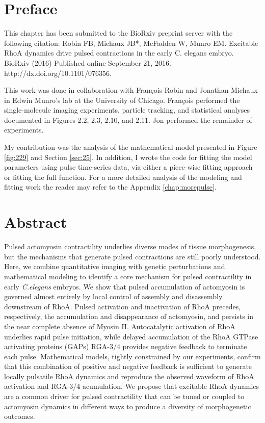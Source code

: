 
\section{Preface}
This chapter has been submitted to the BioRxiv preprint server with the following citation: Robin FB, Michaux JB*, McFadden W, Munro EM.  Excitable RhoA dynamics drive pulsed contractions in the early C. elegans embryo.  BioRxiv (2016) Published online September 21, 2016. http://dx.doi.org/10.1101/076356.


This work was done in collaboration with Fran\c{c}ois Robin and Jonathan Michaux in Edwin Munro's lab at the University of Chicago.  Fran\c{c}ois performed the single-molecule imaging experiments, particle tracking, and statistical analyses documented in Figures 2.2, 2.3, 2.10, and 2.11.  Jon performed the remainder of experiments.  

My contribution was the analysis of the mathematical model presented in Figure \ref{fig:229} and Section \ref{sec:25}.  In addition, I wrote the code for fitting the model parameters using pulse time-series data, via either a piece-wise fitting approach or fitting the full function.  For a more detailed analysis of the modeling and fitting work the reader may refer to the Appendix \ref{chap:morepulse}.

\section{Abstract}
Pulsed actomyosin contractility underlies diverse modes of tissue morphogenesis, but the mechanisms that generate pulsed contractions are still poorly understood.  Here, we combine quantitative imaging with genetic perturbations and mathematical modeling to identify a core mechanism for pulsed contractility in early \textit{C.elegans} embryos.  We show that pulsed accumulation of actomyosin is governed almost entirely by local control of assembly and disassembly downstream of RhoA.  Pulsed activation and inactivation of RhoA precedes, respectively, the accumulation and disappearance of actomyosin, and persists in the near complete absence of Myosin II.  Autocatalytic activation of RhoA underlies rapid pulse initiation, while delayed accumulation of the RhoA GTPase activating proteins (GAPs) RGA-3/4 provides negative feedback to terminate each pulse. Mathematical models, tightly constrained by our experiments, confirm that this combination of positive and negative feedback is sufficient to generate locally pulsatile RhoA dynamics and reproduce the observed waveform of RhoA activation and RGA-3/4 acumulation. We propose that excitable RhoA dynamics are a common driver for pulsed contractility that can be tuned or coupled to actomyosin dynamics in different ways to produce a diversity of morphogenetic outcomes.


